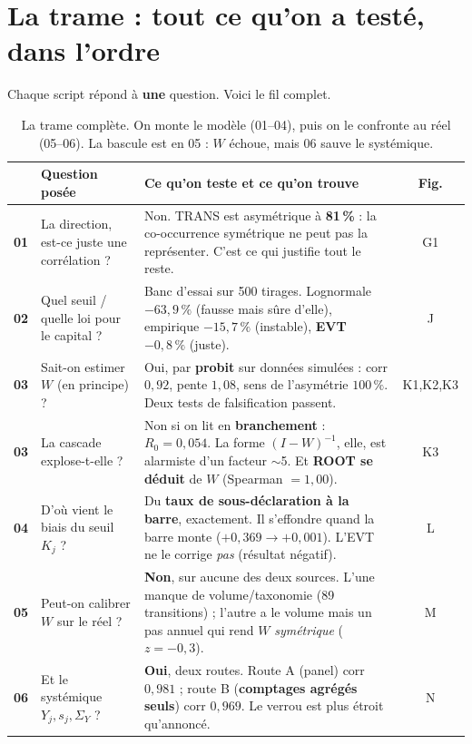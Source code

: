 \documentclass[11pt,a4paper]{article}
\newcommand{\Y}{Y}
\begin{document}
\section{La trame : tout ce qu'on a testé, dans l'ordre}
\label{sec:trame}

Chaque script répond à \textbf{une} question. Voici le fil complet.

\begin{table}[htbp]\centering\small
\renewcommand{\arraystretch}{1.3}
\begin{tabularx}{\textwidth}{@{}p{0.7cm} >{\raggedright\arraybackslash}p{3.5cm} >{\raggedright\arraybackslash}X c@{}}
\toprule
& \textbf{Question posée} & \textbf{Ce qu'on teste et ce qu'on trouve} & \textbf{Fig.} \\
\midrule
\textbf{01} & La direction, est-ce juste une corrélation ? &
Non. TRANS est asymétrique à \textbf{81\,\%} : la co-occurrence symétrique ne peut pas la
représenter. C'est ce qui justifie tout le reste. & G1 \\
\addlinespace[3pt]
\textbf{02} & Quel seuil / quelle loi pour le capital ? &
Banc d'essai sur 500 tirages. Lognormale $-63{,}9\,\%$ (fausse mais sûre d'elle), empirique
$-15{,}7\,\%$ (instable), \textbf{EVT $-0{,}8\,\%$} (juste). & J \\
\addlinespace[3pt]
\textbf{03} & Sait-on estimer $W$ (en principe) ? &
Oui, par \textbf{probit} sur données simulées : corr $0{,}92$, pente $1{,}08$, sens de
l'asymétrie $100\,\%$. Deux tests de falsification passent. & K1,K2,K3 \\
\addlinespace[3pt]
\textbf{03} & La cascade explose-t-elle ? &
Non si on lit en \textbf{branchement} : $R_0=0{,}054$. La forme $(I-W)^{-1}$, elle, est
alarmiste d'un facteur $\sim$5. Et \textbf{ROOT se déduit} de $W$ (Spearman $=1{,}00$). & K3 \\
\addlinespace[3pt]
\textbf{04} & D'où vient le biais du seuil $K_j$ ? &
Du \textbf{taux de sous-déclaration à la barre}, exactement. Il s'effondre quand la barre
monte ($+0{,}369 \to +0{,}001$). L'EVT ne le corrige \emph{pas} (résultat négatif). & L \\
\addlinespace[3pt]
\textbf{05} & Peut-on calibrer $W$ sur le réel ? &
\textbf{Non}, sur aucune des deux sources. L'une manque de volume/taxonomie (89 transitions) ;
l'autre a le volume mais un pas annuel qui rend $W$ \emph{symétrique} ($z=-0{,}3$). & M \\
\addlinespace[3pt]
\textbf{06} & Et le systémique $\Y_j,s_j,\Sigma_Y$ ? &
\textbf{Oui}, deux routes. Route A (panel) corr $0{,}981$ ; route B (\textbf{comptages
agrégés seuls}) corr $0{,}969$. Le verrou est plus étroit qu'annoncé. & N \\
\bottomrule
\end{tabularx}
\caption{La trame complète. On monte le modèle (01--04), puis on le confronte au réel
(05--06). La bascule est en 05 : $W$ échoue, mais 06 sauve le systémique.}
\end{table}
\end{document}
